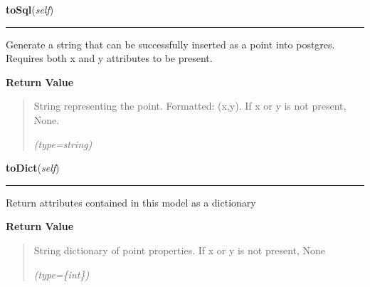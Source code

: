     \label{src:dao:model:point:point:toSql}

    \vspace{0.5ex}

\hspace{.8\funcindent}\begin{boxedminipage}{\funcwidth}

    \raggedright \textbf{toSql}(\textit{self})

    \vspace{-1.5ex}

    \rule{\textwidth}{0.5\fboxrule}
\setlength{\parskip}{2ex}
    Generate a string that can be successfully inserted as a point into 
    postgres. Requires both x and y attributes to be present.

\setlength{\parskip}{1ex}
      \textbf{Return Value}
    \vspace{-1ex}

      \begin{quote}
      String representing the point. Formatted: (x,y). If x or y is not 
      present, None.

      {\it (type=string)}

      \end{quote}

    \end{boxedminipage}

    \label{src:dao:model:point:point:toDict}

    \vspace{0.5ex}

\hspace{.8\funcindent}\begin{boxedminipage}{\funcwidth}

    \raggedright \textbf{toDict}(\textit{self})

    \vspace{-1.5ex}

    \rule{\textwidth}{0.5\fboxrule}
\setlength{\parskip}{2ex}
    Return attributes contained in this model as a dictionary

\setlength{\parskip}{1ex}
      \textbf{Return Value}
    \vspace{-1ex}

      \begin{quote}
      String dictionary of point properties. If x or y is not present, None

      {\it (type=\{int\})}

      \end{quote}

    \end{boxedminipage}

